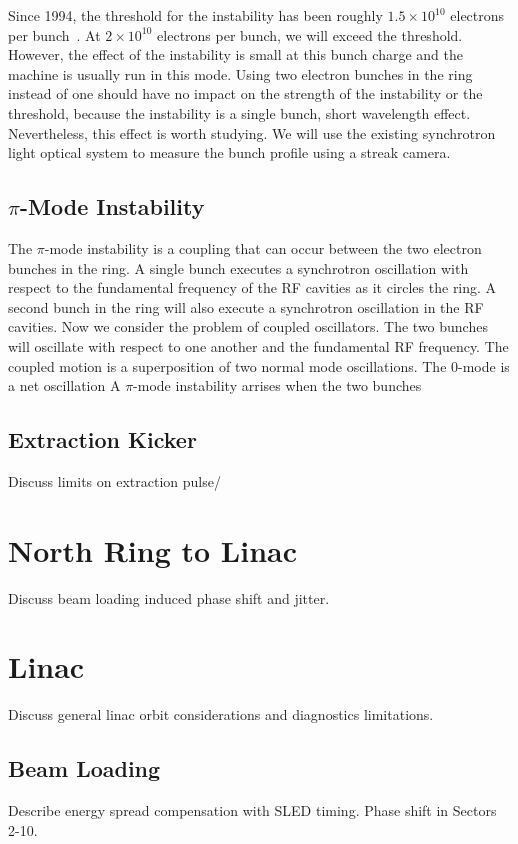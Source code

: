 \documentclass[aps,prl,preprint,groupedaddress]{revtex4-1}
\begin{document}
Since 1994, the threshold for the instability has been roughly $1.5 \times 10^{10}$ electrons per bunch~\cite{sawtooth}. At $2 \times 10^{10}$ electrons per bunch, we will exceed the threshold. However, the effect of the instability is small at this bunch charge and the machine is usually run in this mode. Using two electron bunches in the ring instead of one should have no impact on the strength of the instability or the threshold, because the instability is a single bunch, short wavelength effect. Nevertheless, this effect is worth studying. We will use the existing synchrotron light optical system to measure the bunch profile using a streak camera.

\subsection{$\pi$-Mode Instability}
The $\pi$-mode instability is a coupling that can occur between the two electron bunches in the ring. A single bunch executes a synchrotron oscillation with respect to the fundamental frequency of the RF cavities as it circles the ring. A second bunch in the ring will also execute a synchrotron oscillation in the RF cavities. Now we consider the problem of coupled oscillators. The two bunches will oscillate with respect to one another and the fundamental RF frequency. The coupled motion is a superposition of two normal mode oscillations. The 0-mode is a net oscillation  A $\pi$-mode instability arrises when the two bunches 

\subsection{Extraction Kicker}
Discuss limits on extraction pulse/

\section{North Ring to Linac}
Discuss beam loading induced phase shift and jitter.

\section{Linac}
Discuss general linac orbit considerations and diagnostics limitations.

\subsection{Beam Loading}
Describe energy spread compensation with SLED timing. Phase shift in Sectors 2-10.
\end{document}
